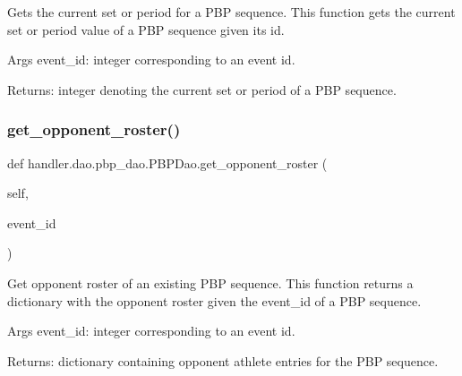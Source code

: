 \begin{DoxyVerb}Gets the current set or period for a PBP sequence.
This function gets the current set or period value of a PBP sequence given its id.

Args
    event_id: integer corresponding to an event id.

Returns:
    integer denoting the current set or period of a PBP sequence.
\end{DoxyVerb}
 \mbox{\label{classhandler_1_1dao_1_1pbp__dao_1_1_p_b_p_dao_a528c269edcf0f3aaaa3a16865091a686}} 
\subsubsection{\texorpdfstring{get\+\_\+opponent\+\_\+roster()}{get\_opponent\_roster()}}
{\footnotesize\ttfamily def handler.\+dao.\+pbp\+\_\+dao.\+P\+B\+P\+Dao.\+get\+\_\+opponent\+\_\+roster (\begin{DoxyParamCaption}\item[{}]{self,  }\item[{}]{event\+\_\+id }\end{DoxyParamCaption})}

\begin{DoxyVerb}Get opponent roster of an existing PBP sequence.
This function returns a dictionary with the opponent roster given the event_id of a PBP sequence.

Args
    event_id: integer corresponding to an event id.

Returns:
    dictionary containing opponent athlete entries for the PBP sequence.
\end{DoxyVerb}
 \mbox{\label{classhandler_1_1dao_1_1pbp__dao_1_1_p_b_p_dao_ab64fb33991baf49a73cc8a5180b8b74e}} 

